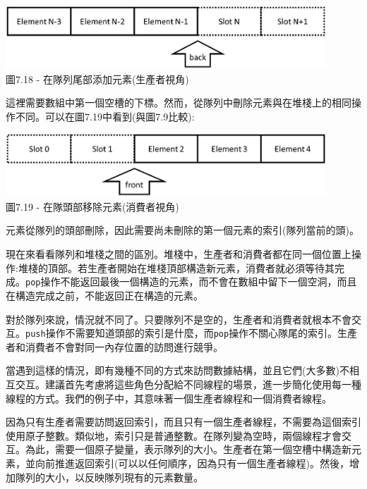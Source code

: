 \begin{center}
\includegraphics[width=0.9\textwidth]{content/2/chapter7/images/18.jpg}\\
圖7.18 - 在隊列尾部添加元素(生產者視角)
\end{center}

這裡需要數組中第一個空槽的下標。然而，從隊列中刪除元素與在堆棧上的相同操作不同。可以在圖7.19中看到(與圖7.9比較):

\begin{center}
\includegraphics[width=0.9\textwidth]{content/2/chapter7/images/19.jpg}\\
圖7.19 - 在隊頭部移除元素(消費者視角)
\end{center}

元素從隊列的頭部刪除，因此需要尚未刪除的第一個元素的索引(隊列當前的頭)。

現在來看看隊列和堆棧之間的區別。堆棧中，生產者和消費者都在同一個位置上操作:堆棧的頂部。若生產者開始在堆棧頂部構造新元素，消費者就必須等待其完成。\texttt{pop}操作不能返回最後一個構造的元素，而不會在數組中留下一個空洞，而且在構造完成之前，不能返回正在構造的元素。

對於隊列來說，情況就不同了。只要隊列不是空的，生產者和消費者就根本不會交互。\texttt{push}操作不需要知道頭部的索引是什麼，而\texttt{pop}操作不關心隊尾的索引。生產者和消費者不會對同一內存位置的訪問進行競爭。

當遇到這樣的情況，即有幾種不同的方式來訪問數據結構，並且它們(大多數)不相互交互。建議首先考慮將這些角色分配給不同線程的場景，進一步簡化使用每一種線程的方式。我們的例子中，其意味著一個生產者線程和一個消費者線程。 

因為只有生產者需要訪問返回索引，而且只有一個生產者線程，不需要為這個索引使用原子整數。類似地，索引只是普通整數。在隊列變為空時，兩個線程才會交互。為此，需要一個原子變量，表示隊列的大小。生產者在第一個空槽中構造新元素，並向前推進返回索引(可以以任何順序，因為只有一個生產者線程)。然後，增加隊列的大小，以反映隊列現有的元素數量。 

